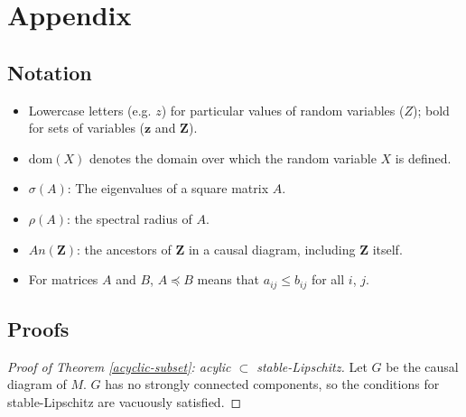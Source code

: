 \documentclass[12pt]{article}
\begin{document}




\section{Appendix}


\subsection{Notation}
\begin{itemize}
  \item Lowercase letters (e.g. $z$) for particular values of random variables ($Z$); bold for sets of variables ($\mathbf{z}$ and $\mathbf{Z}$).
  \item $\text{dom}(X)$ denotes the domain over which the random variable $X$ is defined.
  \item $\sigma(A)$: The eigenvalues of a square matrix $A$.
  \item $\rho(A)$: the spectral radius of $A$.
  \item $An(\mathbf{Z})$: the ancestors of $\mathbf{Z}$ in a causal diagram, including $\mathbf{Z}$ itself.
  \item For matrices $A$ and $B$, $A \preceq B$ means that $a_{ij}\leq b_{ij}$ for all $i$, $j$.
\end{itemize}

\subsection{Proofs}


\begin{proof}[Proof of Theorem \ref{acyclic-subset}: acylic $\subset$ stable-Lipschitz]
Let $G$ be the causal diagram of $M$. $G$ has no strongly connected components, so the conditions for stable-Lipschitz are vacuously satisfied.
\end{proof}
\end{document}
